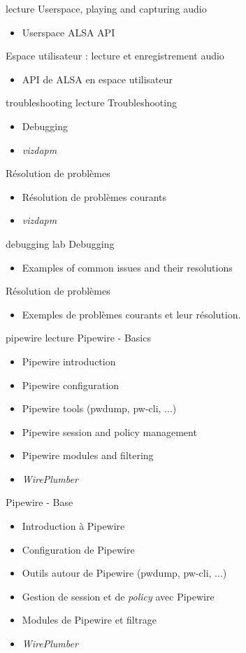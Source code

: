 {lecture}
{Userspace, playing and capturing audio}
{
  \begin{itemize}
  \item Userspace ALSA API
  \end{itemize}
  \vspace{0.5em}
}
{Espace utilisateur : lecture et enregistrement audio}
{
  \begin{itemize}
  \item API de ALSA en espace utilisateur
  \end{itemize}
  \vspace{0.5em}
}
{troubleshooting}
{lecture}
{Troubleshooting}
{
  \begin{itemize}
  \item Debugging
  \item {\em vizdapm}
  \end{itemize}
  \vspace{0.5em}
}
{Résolution de problèmes}
{
  \begin{itemize}
  \item Résolution de problèmes courants
  \item {\em vizdapm}
  \end{itemize}
  \vspace{0.5em}
}
{debugging}
{lab}
{Debugging}
{
  \begin{itemize}
  \item Examples of common issues and their resolutions
  \end{itemize}
}
{Résolution de problèmes}
{
  \begin{itemize}
  \item Exemples de problèmes courants et leur résolution.
  \end{itemize}
}
{pipewire}
{lecture}
{Pipewire - Basics}
{
  \begin{itemize}
  \item Pipewire introduction
  \item Pipewire configuration
  \item Pipewire tools (pwdump, pw-cli, ...)
  \item Pipewire session and policy management
  \item Pipewire modules and filtering
  \item {\em WirePlumber}
  \end{itemize}
  \vspace{0.5em}
}
{Pipewire - Base}
{
  \begin{itemize}
  \item Introduction à Pipewire
  \item Configuration de Pipewire
  \item Outils autour de Pipewire (pwdump, pw-cli, ...)
  \item Gestion de session et de {\em policy} avec Pipewire
  \item Modules de Pipewire et filtrage
  \item {\em WirePlumber}
  \end{itemize}
  \vspace{0.5em}
}
